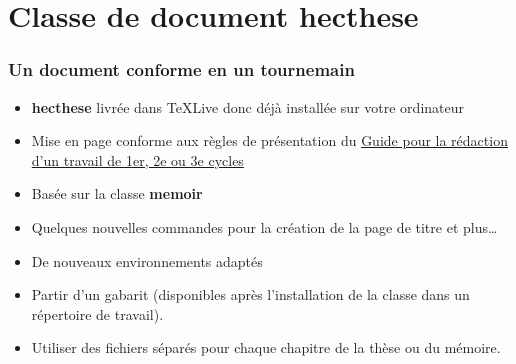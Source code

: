 \section{Classe de document hecthese}


\begin{frame}

	\frametitle{Un document conforme en un tournemain}
	
	\begin{itemize}
		\item \textbf{hecthese} livrée dans \TeX Live donc déjà installée sur votre ordinateur
		\item Mise en page conforme aux règles de présentation du
			\href{http://www.hec.ca/qualitecomm/caf/guide-redaction-travail-cycles.pdf}{%
				Guide pour la rédaction d'un travail de 1er, 2e ou 3e cycles}
		\item Basée sur la classe \textbf{memoir}
		\item Quelques nouvelles commandes pour la création de la page de titre et plus\ldots
		\item De nouveaux environnements adaptés
		\item Partir d’un gabarit (disponibles après l'installation de la classe dans un répertoire de travail).
		\item Utiliser des fichiers séparés pour chaque chapitre de la thèse ou	du mémoire.
	\end{itemize}
\end{frame}


